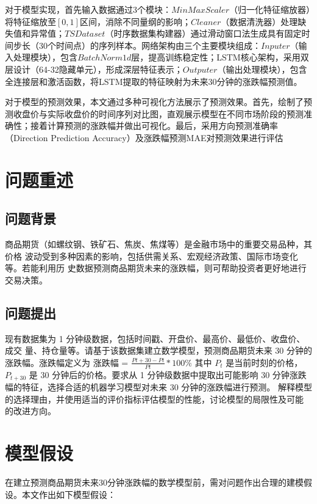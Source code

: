 \documentclass[a4paper,11pt]{ctexart}
\begin{document}
对于模型实现，首先输入数据通过3个模块：${MinMaxScaler}$（归一化特征缩放器）将特征缩放至$[0,1]$区间，消除不同量纲的影响；${Cleaner}$（数据清洗器）处理缺失值和异常值；${TS Dataset}$（时序数据集构建器）通过滑动窗口法生成具有固定时间步长（30个时间点）的序列样本。网络架构由三个主要模块组成：${Inputer}$（输入处理模块），包含${BatchNorm1d}$层，提高训练稳定性；LSTM核心架构，采用双层设计（64-32隐藏单元），形成深层特征表示；${Outputer}$（输出处理模块），包含全连接层和激活函数，将LSTM提取的特征映射为未来30分钟的涨跌幅预测值。

对于模型的预测效果，本文通过多种可视化方法展示了预测效果。首先，绘制了预测收盘价与实际收盘价的时间序列对比图，直观展示模型在不同市场阶段的预测准确性；接着计算预测的涨跌幅并做出可视化。最后，采用方向预测准确率（Direction Prediction Accuracy）及涨跌幅预测MAE对预测效果进行评估

\section{问题重述}
\subsection{问题背景}
商品期货（如螺纹钢、铁矿石、焦炭、焦煤等）是金融市场中的重要交易品种，其价格
波动受到多种因素的影响，包括供需关系、宏观经济政策、国际市场变化等。若能利用历
史数据预测商品期货未来的涨跌幅，则可帮助投资者更好地进行交易决策。




\subsection{问题提出}

现有数据集为 1 分钟级数据，包括时间戳、开盘价、最高价、最低价、收盘价、成交
量、持仓量等。请基于该数据集建立数学模型，预测商品期货未来 30 分钟的涨跌幅。涨跌幅定义为
涨跌幅 = ${ \frac{Pt+30 - Pt}{Pt} * 100\% }$
其中 $P_t$ 是当前时刻的价格，$P_{t+30}$ 是 30 分钟后的价格。要求从 1 分钟级数据中提取出可能影响 30 分钟涨跌幅的特征，选择合适的机器学习模型对未来 30 分钟的涨跌幅进行预测。
解释模型的选择理由，并使用适当的评价指标评估模型的性能，讨论模型的局限性及可能
的改进方向。
\section{模型假设}
在建立预测商品期货未来30分钟涨跌幅的数学模型前，需对问题作出合理的建模假设。本文作出如下模型假设：
\end{document}
